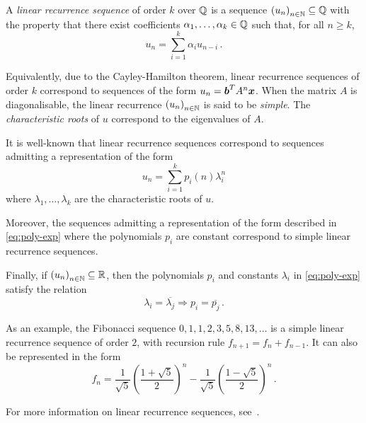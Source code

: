 \label{sec:LRS}

A \emph{linear recurrence sequence} of order $k$ over $\mathbb{Q}$ is a sequence ${(u_{n})}_{n \in \mathbb{N}} \subseteq \mathbb{Q}$ with the property that there exist coefficients $\alpha_{1}, \ldots, \alpha_{k} \in \mathbb{Q}$ such that, for all $n \geq k$,
\begin{equation*}
  u_{n} = \sum\limits_{i=1}^{k} \alpha_{i} u_{n-i}\, .
\end{equation*}

Equivalently, due to the Cayley-Hamilton theorem, linear recurrence sequences of order $k$ correspond to sequences of the form $u_{n} = \boldsymbol{b}^{T} A^{n} \boldsymbol{x}$. When the matrix $A$ is diagonalisable, the linear recurrence ${(u_{n})}_{n \in \mathbb{N}}$ is said to be \emph{simple}. The \emph{characteristic roots} of $u$ correspond to the eigenvalues of $A$.

It is well-known that linear recurrence sequences correspond to sequences admitting a representation of the form
\begin{equation}
  \label{eq:poly-exp}
  u_{n} = \sum\limits_{i=1}^{k} p_{i}(n) \lambda_{i}^{n}
\end{equation}
where $\lambda_{1}, \ldots, \lambda_{k}$ are the characteristic roots of $u$.

Moreover, the sequences admitting a representation of the form described in \cref{eq:poly-exp} where the polynomials $p_{i}$ are constant correspond to simple linear recurrence sequences.

Finally, if ${(u_{n})}_{n \in \mathbb{N}} \subseteq \mathbb{R}$, then the polynomials $p_{i}$ and constants $\lambda_{i}$ in \cref{eq:poly-exp} satisfy the relation
\begin{equation*}
  \label{eq:real_property}
  \lambda_{i} = \overline{\lambda_{j}} \Rightarrow p_{i} = \overline{p_{j}} \, .
\end{equation*}

As an example, the Fibonacci sequence $0, 1, 1, 2, 3, 5, 8, 13, \ldots$ is a simple linear recurrence sequence of order $2$, with recursion rule $f_{n+1} = f_{n} + f_{n-1}$. It can also be represented in the form
\begin{equation*}
  f_{n} = \frac{1}{\sqrt{5}} {\left(\frac{1+\sqrt{5}}{2} \right)}^{n} - \frac{1}{\sqrt{5}} {\left( \frac{1-\sqrt{5}}{2} \right)}^{n} \, .
\end{equation*}

For more information on linear recurrence sequences, see~\cite{BOOK}.

